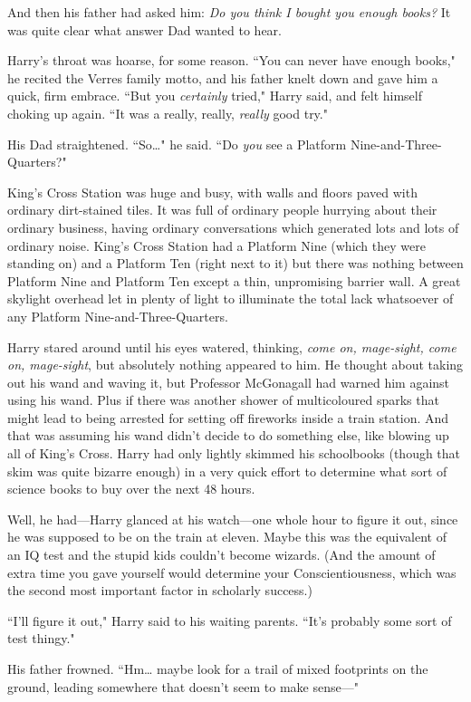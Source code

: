 And then his father had asked him: \emph{Do you think I bought you enough books?} It was quite clear what answer Dad wanted to hear.

Harry's throat was hoarse, for some reason. ``You can never have enough books," he recited the Verres family motto, and his father knelt down and gave him a quick, firm embrace. ``But you \emph{certainly} tried," Harry said, and felt himself choking up again. ``It was a really, really, \emph{really} good try."

His Dad straightened. ``So{\ldots}" he said. ``Do \emph{you} see a Platform Nine-and-Three-Quarters?"

King's Cross Station was huge and busy, with walls and floors paved with ordinary dirt-stained tiles. It was full of ordinary people hurrying about their ordinary business, having ordinary conversations which generated lots and lots of ordinary noise. King's Cross Station had a Platform Nine (which they were standing on) and a Platform Ten (right next to it) but there was nothing between Platform Nine and Platform Ten except a thin, unpromising barrier wall. A great skylight overhead let in plenty of light to illuminate the total lack whatsoever of any Platform Nine-and-Three-Quarters.

Harry stared around until his eyes watered, thinking, \emph{come on, mage-sight, come on, mage-sight}, but absolutely nothing appeared to him. He thought about taking out his wand and waving it, but Professor McGonagall had warned him against using his wand. Plus if there was another shower of multicoloured sparks that might lead to being arrested for setting off fireworks inside a train station. And that was assuming his wand didn't decide to do something else, like blowing up all of King's Cross. Harry had only lightly skimmed his schoolbooks (though that skim was quite bizarre enough) in a very quick effort to determine what sort of science books to buy over the next 48 hours.

Well, he had—Harry glanced at his watch—one whole hour to figure it out, since he was supposed to be on the train at eleven. Maybe this was the equivalent of an IQ test and the stupid kids couldn't become wizards. (And the amount of extra time you gave yourself would determine your Conscientiousness, which was the second most important factor in scholarly success.)

``I'll figure it out," Harry said to his waiting parents. ``It's probably some sort of test thingy."

His father frowned. ``Hm{\ldots} maybe look for a trail of mixed footprints on the ground, leading somewhere that doesn't seem to make sense—"

